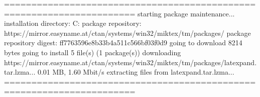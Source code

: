 
======================================================================
starting package maintenance...
installation directory: C:\Users\User\dev\MikTex
package repository: https://mirror.easyname.at/ctan/systems/win32/miktex/tm/packages/
package repository digest: ff7763596e8b33b4a511c566bf03f0d9
going to download 8214 bytes
going to install 5 file(s) (1 package(s))
downloading https://mirror.easyname.at/ctan/systems/win32/miktex/tm/packages/latexpand.tar.lzma...
0.01 MB, 1.60 Mbit/s
extracting files from latexpand.tar.lzma...
======================================================================
